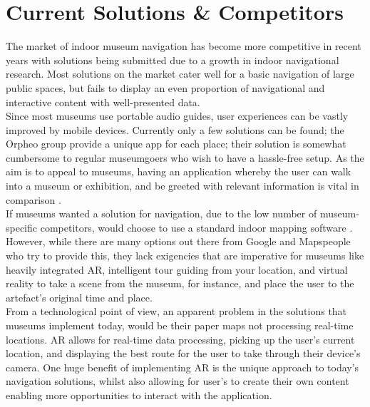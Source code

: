 
\section{Current Solutions \& Competitors}
The market of indoor museum navigation has become more competitive in recent years with solutions being submitted due to a growth in indoor navigational research. Most solutions on the market cater well for a basic navigation of large public spaces, but fails to display an even proportion of navigational and interactive content with well-presented data.\\

Since most museums use portable audio guides, user experiences can be vastly improved by mobile devices. Currently only a few solutions can be found; the Orpheo group \cite{orpheo} provide a unique app for each place; their solution is somewhat cumbersome to regular museumgoers who wish to have a hassle-free setup. As the aim is to appeal to museums, having an application whereby the user can walk into a museum or exhibition, and be greeted with relevant information is vital in comparison \cite{microsoft}.\\

If museums wanted a solution for navigation, due to the low number of museum-specific competitors, would choose to use a standard indoor mapping software \cite{engadget}. However, while there are many options out there from Google and Mapspeople \cite{mapspeople} who try to provide this, they lack exigencies that are imperative for museums like heavily integrated AR, intelligent tour guiding from your location, and virtual reality to take a scene from the museum, for instance, and place the user to the artefact's original time and place.\\

From a technological point of view, an apparent problem in the solutions that museums implement today, would be their paper maps not processing real-time locations. AR allows for real-time data processing, picking up the user's current location, and displaying the best route for the user to take through their device's camera. One huge benefit of implementing AR is the unique approach to today's navigation solutions, whilst also allowing for user's to create their own content enabling more opportunities to interact with the application.